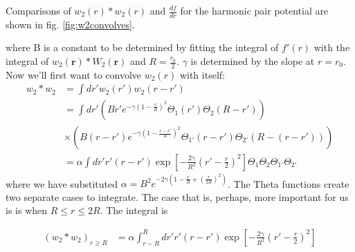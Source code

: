 \documentclass[letterpaper,twocolumn,amsmath,amssymb,prb]{revtex4-1}
\newcommand{\rr}{\textbf{r}}
\begin{document}
Comparisons of $w_2(r)\ast w_2(r)$ and $\frac{df}{dr}$ for the harmonic
pair potential are shown in fig. \ref{fig:w2convolves}.

where B is a constant to be determined by fitting the integral of
$f'(r)$ with the integral of $w_2(\rr)\ast W_2(\rr)$ and $R =
\frac{r_0}{2}$.  $\gamma$ is determined by the slope at $r = r_0$.  
Now we'll first want to convolve $w_2(r)$ with
itself:
\begin{align*}
  w_2 \ast w_2 &= \int dr' w_2 (r')w_2(r - r') \\ 
     &= \int dr' \left(B r' e^{- \gamma \left (1 - \frac{r}{R} \right )^2}
                              \Theta_1 (r') \Theta_2 (R - r') \right) \\
     &\times \left( B (r-r') e^{- \gamma \left(1 - \frac{r-r'}{R}
                                \right)^2}\Theta_{1'} (r-r') \Theta_{2'} (R -
                                (r-r')) \right) \\
     &= \alpha \int dr' r'(r-r') \exp \left [-\frac{2\gamma}{R^2} \left (r' -
                              \frac{r}{2} \right)^2 \right ] \Theta_1
                              \Theta_2 \Theta_{1'} \Theta_{2'}
\end{align*}
where we have substituted $\alpha = B^2 e^{- 2 \gamma \left(1 -
  \frac{r}{R} + (\frac{r}{2R})^2 \right )}$. The Theta functions create two separate
cases to integrate.  The case that is, perhaps, more important for us
is is when $R \leq r \leq 2R$.  The integral is

\begin{align}
(w_2 \ast w_2)_{r \geq R} &= \alpha \int_{r - R}^R dr' r'(r-r') \exp \left [ -
   \frac {2\gamma}{R^2}\left( r' - \frac{r}{2} \right)^2 \right]
\end{align}
\end{document}
